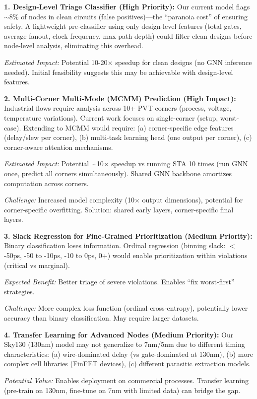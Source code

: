 \documentclass[10pt,twocolumn,journal]{IEEEtran}
\begin{document}
\textbf{1. Design-Level Triage Classifier (High Priority):}
Our current model flags $\sim$8\% of nodes in clean circuits (false positives)---the ``paranoia cost'' of ensuring safety. A lightweight pre-classifier using only design-level features (total gates, average fanout, clock frequency, max path depth) could filter clean designs before node-level analysis, eliminating this overhead.

\textit{Estimated Impact:} Potential 10-20$\times$ speedup for clean designs (no GNN inference needed). Initial feasibility suggests this may be achievable with design-level features.

\textbf{2. Multi-Corner Multi-Mode (MCMM) Prediction (High Impact):}
Industrial flows require analysis across 10+ PVT corners (process, voltage, temperature variations). Current work focuses on single-corner (setup, worst-case). Extending to MCMM would require: (a) corner-specific edge features (delay/slew per corner), (b) multi-task learning head (one output per corner), (c) corner-aware attention mechanisms.

\textit{Estimated Impact:} Potential $\sim$10$\times$ speedup vs running STA 10 times (run GNN once, predict all corners simultaneously). Shared GNN backbone amortizes computation across corners.

\textit{Challenge:} Increased model complexity (10$\times$ output dimensions), potential for corner-specific overfitting. Solution: shared early layers, corner-specific final layers.

\textbf{3. Slack Regression for Fine-Grained Prioritization (Medium Priority):}
Binary classification loses information. Ordinal regression (binning slack: $<$-50ps, -50 to -10ps, -10 to 0ps, 0+) would enable prioritization within violations (critical vs marginal).

\textit{Expected Benefit:} Better triage of severe violations. Enables ``fix worst-first'' strategies.

\textit{Challenge:} More complex loss function (ordinal cross-entropy), potentially lower accuracy than binary classification. May require larger datasets.

\textbf{4. Transfer Learning for Advanced Nodes (Medium Priority):}
Our Sky130 (130nm) model may not generalize to 7nm/5nm due to different timing characteristics: (a) wire-dominated delay (vs gate-dominated at 130nm), (b) more complex cell libraries (FinFET devices), (c) different parasitic extraction models.

\textit{Potential Value:} Enables deployment on commercial processes. Transfer learning (pre-train on 130nm, fine-tune on 7nm with limited data) can bridge the gap.
\end{document}
